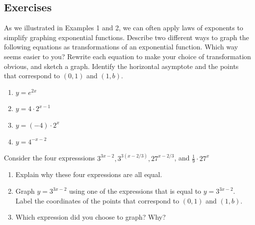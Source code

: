 \documentclass[10pt,]{book}
\theoremstyle{ptxdefinitionnotitle}
\theoremstyle{ptxdefinitiontitle}
\theoremstyle{ptxdefinitionnotitle}
\theoremstyle{ptxdefinitiontitle}
\theoremstyle{ptxdefinitionnotitle}
\theoremstyle{ptxdefinitiontitle}
\numberwithin{equation}{section}
\begin{document}
\subsection[{Exercises}]{Exercises}\label{exercises-10}
\begin{divisionexercise}{1}\hypertarget{exercise-62}{}
\hypertarget{p-258}{}%
As we illustrated in Examples 1 and 2, we can often apply laws of exponents to simplify graphing exponential functions. Describe two different ways to graph the following equations as transformations of an exponential function.  Which way seems easier to you?  Rewrite each equation to make your choice of transformation obvious, and sketch a graph.  Identify the horizontal asymptote and the points that correspond to \((0,1)\) and \((1,b)\).%
\leavevmode%
\begin{enumerate}[label=(\alph*)]
\item\hypertarget{li-121}{}\(y=e^{2x}\)%
\item\hypertarget{li-122}{}\(y = 4 \cdot 2^{x-1}\)%
\item\hypertarget{li-123}{}\(y = (-4) \cdot 2^x\)%
\item\hypertarget{li-124}{}\(y = 4^{-x-2}\)%
\end{enumerate}
\end{divisionexercise}%
\begin{divisionexercise}{2}\hypertarget{exercise-63}{}
\hypertarget{p-259}{}%
Consider the four expresssions \(3^{3x-2}, 3^{3(x-2/3)}, 27^{x-2/3}\), and \(\frac{1}{9} \cdot 27^x\)%
\leavevmode%
\begin{enumerate}[label=(\alph*)]
\item\hypertarget{li-125}{}Explain why these four expressions are all equal.%
\item\hypertarget{li-126}{}Graph \(y=3^{3x-2}\) using one of the expressions that is equal to \(y=3^{3x-2}\). Label the coordinates of the points that correspond to \((0, 1)\) and \((1, b)\).%
\item\hypertarget{li-127}{}Which expression did  you choose to graph?  Why?%
\end{enumerate}
\end{divisionexercise}%
\end{document}
